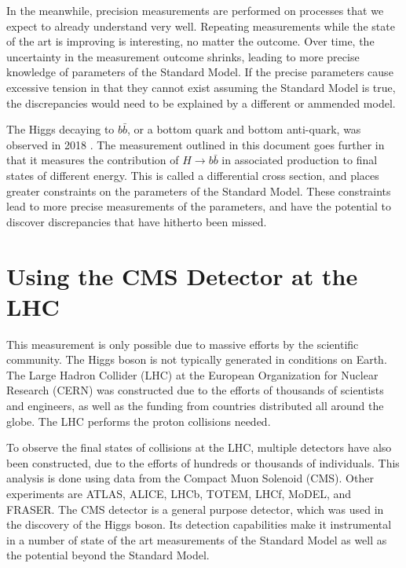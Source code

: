 In the meanwhile, precision measurements are performed on
processes that we expect to already understand very well.
Repeating measurements while the state of the art is improving is interesting,
no matter the outcome.
Over time, the uncertainty in the measurement outcome shrinks,
leading to more precise knowledge of parameters of the Standard Model.
If the precise parameters cause excessive tension in that they cannot exist
assuming the Standard Model is true,
the discrepancies would need to be explained by a different or ammended model.

The Higgs decaying to $b\bar{b}$, or a bottom quark and bottom anti-quark,
was observed in 2018 \cite{obs-18, Aaboud_2018}.
The measurement outlined in this document goes further in that
it measures the contribution of $H \rightarrow b\bar{b}$ in associated production
to final states of different energy.
This is called a differential cross section,
and places greater constraints on the parameters of the Standard Model.
These constraints lead to more precise measurements of the parameters,
and have the potential to discover discrepancies that have hitherto been missed.

\section{Using the CMS Detector at the LHC}

This measurement is only possible due to massive efforts by the scientific community.
The Higgs boson is not typically generated in conditions on Earth.
The Large Hadron Collider (LHC) at the European Organization for Nuclear Research (CERN)
was constructed due to the efforts of thousands of scientists and engineers,
as well as the funding from countries distributed all around the globe.
The LHC performs the proton collisions needed.

To observe the final states of collisions at the LHC,
multiple detectors have also been constructed,
due to the efforts of hundreds or thousands of individuals.
This analysis is done using data from the Compact Muon Solenoid (CMS).
Other experiments are ATLAS, ALICE, LHCb, TOTEM, LHCf, MoDEL, and FRASER.
The CMS detector is a general purpose detector,
which was used in the discovery of the Higgs boson.
Its detection capabilities make it instrumental in a number of state of the art
measurements of the Standard Model as well as the potential beyond the Standard Model.
